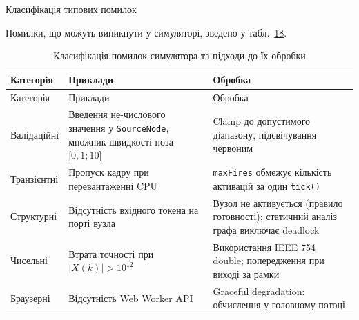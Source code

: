 Класифікація типових помилок

Помилки, що можуть виникнути у симуляторі, зведено у
табл.~\hyperref[tab:errors]{18}.

\begin{longtable}[]{@{}
  >{\raggedright\arraybackslash}p{}
  >{\raggedright\arraybackslash}p{}
  >{\raggedright\arraybackslash}p{}@{}}
\caption{\protect{}\label{tab:errors}{}Класифікація помилок
симулятора та підходи до їх обробки}\tabularnewline
\toprule\noalign{}
\begin{minipage}[b]{\linewidth}\raggedright
Категорія
\end{minipage} & \begin{minipage}[b]{\linewidth}\raggedright
Приклади
\end{minipage} & \begin{minipage}[b]{\linewidth}\raggedright
Обробка
\end{minipage} \\
\midrule\noalign{}
\endfirsthead
\toprule\noalign{}
\begin{minipage}[b]{\linewidth}\raggedright
Категорія
\end{minipage} & \begin{minipage}[b]{\linewidth}\raggedright
Приклади
\end{minipage} & \begin{minipage}[b]{\linewidth}\raggedright
Обробка
\end{minipage} \\
\midrule\noalign{}
\endhead
\bottomrule\noalign{}
\endlastfoot
Валідаційні & Введення не-числового значення у \texttt{SourceNode},
множник швидкості поза \(\lbrack 0,1;10\rbrack\) & Clamp до допустимого
діапазону, підсвічування червоним \\
Транзієнтні & Пропуск кадру при перевантаженні CPU & \texttt{maxFires}
обмежує кількість активацій за один \texttt{tick()} \\
Структурні & Відсутність вхідного токена на порті вузла & Вузол не
активується (правило готовності); статичний аналіз графа виключає
deadlock \\
Чисельні & Втрата точності при \(|X(k)| > 10^{12}\) & Використання IEEE
754 double; попередження при виході за рамки \\
Браузерні & Відсутність Web Worker API & Graceful degradation:
обчислення у головному потоці \\
\end{longtable}

